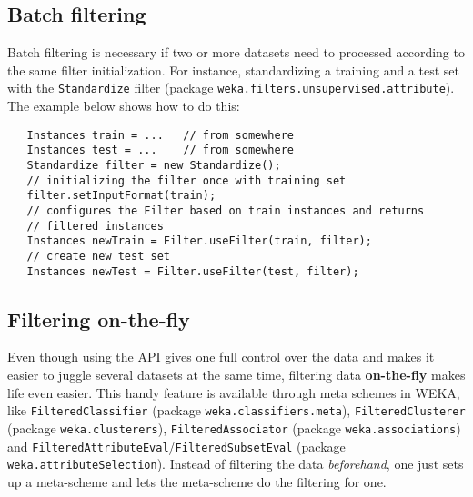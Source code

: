 \subsection{Batch filtering}
Batch filtering is necessary if two or more datasets need to processed
according to the same filter initialization. For instance, standardizing a
training and a test set with the \texttt{Standardize} filter (package
\texttt{weka.filters.unsupervised.attribute}). The example below shows how to
do this:
\begin{verbatim}
   Instances train = ...   // from somewhere
   Instances test = ...    // from somewhere
   Standardize filter = new Standardize();
   // initializing the filter once with training set
   filter.setInputFormat(train);
   // configures the Filter based on train instances and returns
   // filtered instances
   Instances newTrain = Filter.useFilter(train, filter);
   // create new test set
   Instances newTest = Filter.useFilter(test, filter);
\end{verbatim}

\subsection{Filtering on-the-fly}
Even though using the API gives one full control over the data and makes it
easier to juggle several datasets at the same time, filtering data
\textbf{on-the-fly} makes life even easier. This handy feature is available
through meta schemes in WEKA, like \texttt{FilteredClassifier} (package
\texttt{weka.classifiers.meta}), \texttt{FilteredClusterer} (package
\texttt{weka.clusterers}), \texttt{FilteredAssociator} (package
\texttt{weka.associations}) and
\texttt{FilteredAttributeEval}/\texttt{FilteredSubsetEval} (package
\texttt{weka.attributeSelection}). Instead of filtering the data
\textit{beforehand}, one just sets up a meta-scheme and lets the meta-scheme
do the filtering for one.

\newpage

